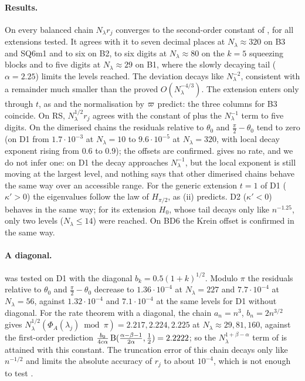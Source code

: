 \paragraph{Results.} On every balanced chain $N_\lambda r_j$ converges to the second-order constant of
, for all extensions tested. It agrees with it to seven decimal places at $N_\lambda\approx320$ on
B3 and SQ6m1 and to six on B2, to six digits at $N_\lambda\approx80$ on the $k=5$ squeezing blocks and to five digits at
$N_\lambda\approx29$ on B1, where the slowly decaying tail ($\alpha=2.25$) limits the levels reached. The
deviation decays like $N_\lambda^{-2}$, consistent with a remainder much smaller
than the proved $O(N_\lambda^{-4/3})$. The extension enters only through $t$, as  and the
normalisation by $\varpi$ predict: the three columns for B3 coincide. On RS, $N_\lambda^{1/2}r_j$ agrees with
the constant of  plus the $N_\lambda^{-1}$ term to five digits. On the dimerised chains
the residuals relative to $\theta_0$ and $\frac\pi2-\theta_0$ tend to zero (on D1 from $1.7\cdot10^{-3}$ at
$N_\lambda=10$ to $9.6\cdot10^{-5}$ at $N_\lambda=320$, with local decay exponent rising from $0.6$ to $0.9$);
the offsets are confirmed.  gives no rate, and we do not infer one: on D1 the decay
approaches $N_\lambda^{-1}$, but the local exponent is still moving at the largest level, and nothing
says that other dimerised chains behave the same way over an accessible range. For the generic extension $t=1$ of D1
($\kappa'>0$) the eigenvalues follow the law of $H_{\pi/2}$, as (ii) predicts. D2
($\kappa'<0$) behaves in the same way; for its extension $H_0$, whose tail decays only like $n^{-1.25}$,
only two levels ($N_\lambda\le14$) were reached. On BD6 the Krein offset is confirmed in the same way.

\paragraph{A diagonal.}  was tested on D1 with the diagonal
$b_k=0.5(1+k)^{1/2}$. Modulo $\pi$ the residuals relative to $\theta_0$ and
$\frac\pi2-\theta_0$ decrease to $1.36\cdot10^{-4}$ at $N_\lambda=227$ and $7.7\cdot10^{-4}$ at $N_\lambda=56$, against
$1.32\cdot10^{-4}$ and $7.1\cdot10^{-4}$ at the same levels for D1 without diagonal. For the rate theorem with a diagonal,
the chain $a_n=n^3$, $b_n=2n^{3/2}$ gives
$N_\lambda^{1/2}(\Phi_A(\lambda_j)\bmod\pi)=2.217,2.224,2.225$ at $N_\lambda\approx29,81,160$, against the first-order
prediction $\frac{b_0}{4c\alpha}\operatorname{B}(\frac{\alpha-\beta-1}{2\alpha},\frac12)=2.2222$; so the $N_\lambda^{1+\beta-\alpha}$ term of
 is attained with this constant. The truncation error of this chain decays only
like $n^{-1/2}$ and limits the absolute accuracy of $r_j$ to about $10^{-4}$, which is not enough to test
.
